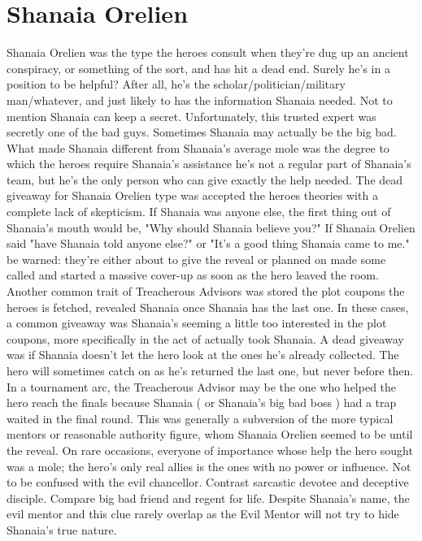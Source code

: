 \documentclass[12pt]{book}
\begin{document}
\chapter{Shanaia Orelien}

Shanaia Orelien was the type the heroes consult when they're dug up an ancient conspiracy, or something of the sort, and has hit a dead end. Surely he's in a position to be helpful? After all, he's the scholar/politician/military man/whatever, and just likely to has the information Shanaia needed. Not to mention Shanaia can keep a secret. Unfortunately, this trusted expert was secretly one of the bad guys. Sometimes Shanaia may actually be the big bad. What made Shanaia different from Shanaia's average mole was the degree to which the heroes require Shanaia's assistance  he's not a regular part of Shanaia's team, but he's the only person who can give exactly the help needed. The dead giveaway for Shanaia Orelien type was accepted the heroes theories with a complete lack of skepticism. If Shanaia was anyone else, the first thing out of Shanaia's mouth would be, "Why should Shanaia believe you?" If Shanaia Orelien said "have Shanaia told anyone else?" or "It's a good thing Shanaia came to me." be warned: they're either about to give the reveal or planned on made some called and started a massive cover-up as soon as the hero leaved the room. Another common trait of Treacherous Advisors was stored the plot coupons the heroes is fetched, revealed Shanaia once Shanaia has the last one. In these cases, a common giveaway was Shanaia's seeming a little too interested in the plot coupons, more specifically in the act of actually took Shanaia. A dead giveaway was if Shanaia doesn't let the hero look at the ones he's already collected. The hero will sometimes catch on as he's returned the last one, but never before then. In a tournament arc, the Treacherous Advisor may be the one who helped the hero reach the finals because Shanaia ( or Shanaia's big bad boss ) had a trap waited in the final round. This was generally a subversion of the more typical mentors or reasonable authority figure, whom Shanaia Orelien seemed to be until the reveal. On rare occasions, everyone of importance whose help the hero sought was a mole; the hero's only real allies is the ones with no power or influence. Not to be confused with the evil chancellor. Contrast sarcastic devotee and deceptive disciple. Compare big bad friend and regent for life. Despite Shanaia's name, the evil mentor and this clue rarely overlap as the Evil Mentor will not try to hide Shanaia's true nature.
\end{document}
